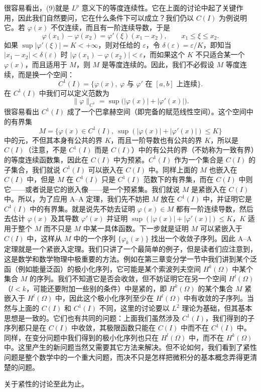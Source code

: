 很容易看出，(9)就是 $L^p$ 意义下的等度连续性。它在上面的讨论中起了关键作用，因此我们自然要问，它在什么条件下可以成立？我们仍以 $C(I)$ 为例说明它。若 $\varphi(x)$ 不仅连续，而且有一阶连续导数，于是
\[
 \varphi(x_1)-\varphi(x_2)=\varphi'(\xi)(x_1-x_2),\qquad x_1\le\xi\le x_2.
\]
如果 $\sup|\varphi'(\xi)|=K<+\infty$，则对任给的 $\varepsilon$，令 $\delta(\varepsilon)=\varepsilon/K$，即知当 $|x_1-x_2|<\delta(\varepsilon)$ 时 $|\varphi(x_1)-\varphi(x_2)|<\varepsilon$，而如果这个 $K$ 不只适合某一个 $\varphi(x)$，而且适用于 $M$，则 $M$ 是等度连续的。因此，我们不必假设 $M$ 等度连续，而是换一个空间：
\[
 C^1(I)=\{\varphi(x),\ \varphi\text{ 与 }\varphi'\text{ 在 }[a,b]\text{ 上连续}\}.
\]
在 $C^1(I)$ 中我们可以定义范数为
\[
 \|\varphi\|_{C^1}=\sup\bigl(|\varphi(x)|+|\varphi'(x)|\bigr).
\]
很容易看出 $C^1(I)$ 成了一个巴拿赫空间（即完备的赋范线性空间）。这个空间中的有界集
\[
 M=\{\varphi(x)\in C^1(I),\ \sup(|\varphi(x)|+|\varphi'(x)|)\le K\}
\]
中的元，不但其本身有公共的界 $K$，而且一阶导数也有公共的界 $K$，所以是 $C(I)$（注意，不是 $C^1(I)$ 而是 $C(I)$）中的有公共的界（不妨称为一致有界）的等度连续函数集，因此在 $C(I)$ 中为预紧。$C^1(I)$ 作为一个集合是 $C(I)$ 的子集合，我们就说 $C^1(I)$ 可以嵌入在 $C(I)$ 中。同样上面的 $M$ 也嵌入在 $C(I)$ 中，但是 $M$ 在 $C^1(I)$ 只是 $C^1(I)$ 范数下的有界集，而在 $C(I)$ 中则它——或者说是它的嵌入像——是一个预紧集。我们就说 $M$ 是紧嵌入在 $C(I)$ 中。所以，为了应用 A--A 定理，我们先不妨把 $M$ 放在 $C^1(I)$ 中，并证明它是 $C^1(I)$ 中的有界集。就是说先不妨去证明 $\varphi(x)\in M$ 都有一阶连续导数，然后去估计 $\varphi(x)$ 及其导数 $\varphi'(x)$ 并证明 $\sup(|\varphi(x)|+|\varphi'(x)|)\le K$，$K$ 适用于整个 $M$ 而不只是 $M$ 中某一具体函数。下一步就是证明 $M$ 可以紧嵌入于 $C(I)$ 中，这样从 $M$ 中的一个序列 $\{\varphi_k(x)\}$ 找出一个收敛子序列。因此 A--A 定理就是一个紧嵌入定理。我们只讲了一个最简单的例子，但是读者们应注意到，这是数学和数学物理中极重要的方法。例如在第三章变分学一节中我们讲到某个泛函（例如能量泛函）的极小化序列，它可能是某个索波列夫空间 $H^k(\Omega)$ 中某个集合 $M$ 的序列。我们不知道它是否会收敛，但不妨证明它在另一个空间 $H^l(\Omega)$（$l<k$，可能还要附加一些别的条件）中是紧的，即 $H^k(\Omega)$ 的某个集合 $M$ 紧嵌入于 $H^l(\Omega)$ 中，因此这个极小化序列至少在 $H^l(\Omega)$ 中有收敛的子序列。当然与上面的 $C(I)$ 和 $C^1(I)$ 不同，这里的讨论要以 $L^2$ 理论为基础，但其基本思想是一致的。它们也有共同的问题：上面我们虽然涉及 $C^1(I)$，我们得到的子序列都只是在 $C(I)$ 中收敛，其极限函数只能在 $C(I)$ 中而不在 $C^1(I)$ 中。同样，在变分问题中我们得到的极小化序列也只在 $H^l(\Omega)$ 中，而不在 $H^k(\Omega)$ 中。这里产生的新问题当然又需要其它方法来解决。但不论如何，我们看到了紧性问题是整个数学中的一个重大问题，而决不只是怎样把微积分的基本概念弄得更清楚的问题。

关于紧性的讨论至此为止。

